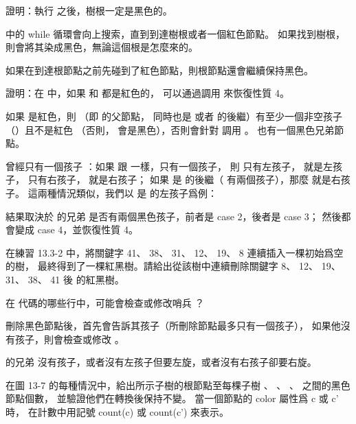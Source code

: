 \startsection[
  title={Deletion},
]

\startEXERCISE
證明：執行  之後，樹根一定是黑色的。
\stopEXERCISE

\startANSWER
{} 中的 while 循環會向上搜索，直到到達樹根或者一個紅色節點。
如果找到樹根，則會將其染成黑色，無論這個根是怎麼來的。

如果在到達根節點之前先碰到了紅色節點，則根節點還會繼續保持黑色。
\stopANSWER

\startEXERCISE
證明：在  中，如果  和  都是紅色的，
可以通過調用  來恢復性質 4。
\stopEXERCISE

\startANSWER
如果  是紅色，則  （即  的父節點，
同時也是  或者  的後繼）有至少一個非空孩子（）且不是紅色
（否則，  會是黑色），否則會針對  調用 。
  也有一個黑色兄弟節點。

 曾經只有一個孩子 ：如果  跟  一樣，只有一個孩子，
則  只有左孩子，  就是左孩子，  只有右孩子，  就是右孩子；
如果  是  的後繼（  有兩個孩子），那麼  就是右孩子。
這兩種情況類似，我們以  是  的左孩子爲例：

結果取決於  的兄弟  是否有兩個黑色孩子，前者是 case 2，後者是 case 3；
然後都會變成 case 4，並恢復性質 4。
\stopANSWER

\startEXERCISE
在練習 13.3-2 中，將關鍵字 41、 38、 31、 12、 19、 8 連續插入一棵初始爲空的樹，
最終得到了一棵紅黑樹。請給出從該樹中連續刪除關鍵字 8、 12、 19、 31、 38、 41 後
的紅黑樹。
\stopEXERCISE

\startANSWER
\startcombination[nx=6,location={top}]
{\externalfigure[output/e13_4_3-1]}{}
{\externalfigure[output/e13_4_3-2]}{}
{\externalfigure[output/e13_4_3-3]}{}
{\externalfigure[output/e13_4_3-4]}{}
{\externalfigure[output/e13_4_3-5]}{}
{\externalfigure[output/e13_4_3-6]}{}
\stopcombination
\stopANSWER

\startEXERCISE
在  代碼的哪些行中，可能會檢查或修改哨兵 ？
\stopEXERCISE

\startANSWER
刪除黑色節點後，首先會告訴其孩子（所刪除節點最多只有一個孩子），
如果他沒有孩子，則會檢查或修改 。

 的兄弟  沒有孩子，或者沒有左孩子但要左旋，或者沒有右孩子卻要右旋。
\stopANSWER

\startEXERCISE
在圖 13-7 的每種情況中，給出所示子樹的根節點至每棵子樹 \m{\alpha}、 \m{\beta}、
 \m{\ldots}、 \m{\epsilon} 之間的黑色節點個數，
並驗證他們在轉換後保持不變。
當一個節點的 color 屬性爲 c 或 c' 時，
在計數中用記號 count(c) 或 count(c') 來表示。
\stopEXERCISE

